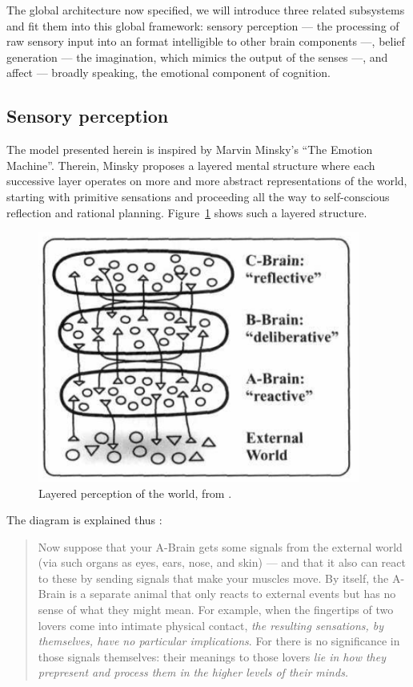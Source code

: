 The global architecture now specified, we will introduce three related subsystems and fit them into this global framework: sensory perception --- the processing of raw sensory input into an format intelligible to other brain components ---, belief generation --- the imagination, which mimics the output of the senses ---, and affect --- broadly speaking, the emotional component of cognition.

\subsection{Sensory perception}\label{sec:sensoryPerception}

The model presented herein is inspired by Marvin Minsky's ``The Emotion Machine''. Therein, Minsky proposes a layered mental structure where each successive layer operates on more and more abstract representations of the world, starting with primitive sensations and proceeding all the way to self-conscious reflection and rational planning. Figure~\ref{fig:brainLayers} shows such a layered structure.

 \begin{figure}[!h]
 	\centering
 	\includegraphics[width=300pt]{Figs/emotionMachine_brainLayers.png}
 	\caption{Layered perception of the world, from \cite[p. 100]{emotionMachine}.}
 	\label{fig:brainLayers}
 \end{figure}
 
 \newpage
 
The diagram is explained thus \cite[p. 100]{emotionMachine}:

\begin{quote}
	Now suppose that your A-Brain gets some signals from the external world (via such organs as eyes, ears, nose, and skin) --- and that it also can react to these by sending signals that make your muscles move. By itself, the A-Brain is a separate animal that only reacts to external events but has no sense of what they might mean. For example, when the fingertips of two lovers come into intimate physical contact, {\em the resulting sensations, by themselves, have no particular implications}. For there is no significance in those signals themselves: their meanings to those lovers {\em lie in how they prepresent and process them in the higher levels of their minds.}
\end{quote}

